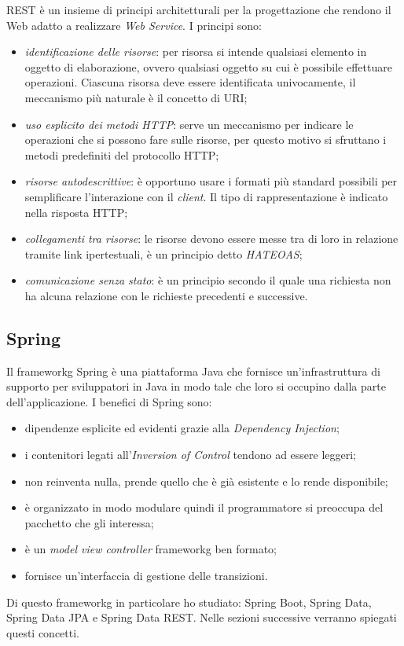 REST è un insieme di principi architetturali per la progettazione che rendono il Web adatto a realizzare \textit{Web Service}. I principi sono:
\begin{itemize}
	\item \textit{identificazione delle risorse}: per risorsa si intende qualsiasi elemento in oggetto di elaborazione, ovvero qualsiasi oggetto su cui è possibile effettuare operazioni. Ciascuna risorsa deve essere identificata univocamente, il meccanismo più naturale è il concetto di URI;
	\item \textit{uso esplicito dei metodi HTTP}: serve un meccanismo per indicare le operazioni che si possono fare sulle risorse, per questo motivo si sfruttano i metodi predefiniti del protocollo HTTP;
	\item \textit{risorse autodescrittive}: è opportuno usare i formati più standard possibili per semplificare l'interazione con il \textit{client}. Il tipo di rappresentazione è indicato nella risposta HTTP;
	\item \textit{collegamenti tra risorse}: le risorse devono essere messe tra di loro in relazione tramite link ipertestuali, è un principio detto \textit{HATEOAS};
	\item \textit{comunicazione senza stato}: è un principio secondo il quale una richiesta non ha alcuna relazione con le richieste precedenti e successive.
\end{itemize}

\subsection{Spring}
\label{subsec:spring}

Il \gls{frameworkg} Spring è una piattaforma Java che fornisce un'infrastruttura di supporto per sviluppatori in Java in modo tale che loro si occupino dalla parte dell'applicazione. I benefici di Spring sono:
\begin{itemize}
	\item dipendenze esplicite ed evidenti grazie alla \textit{Dependency Injection};
	\item i contenitori legati all'\textit{Inversion of Control} tendono ad essere leggeri;
	\item non reinventa nulla, prende quello che è già esistente e lo rende disponibile;
	\item è organizzato in modo modulare quindi il programmatore si preoccupa del pacchetto che gli interessa;
	\item è un \textit{model view controller} \gls{frameworkg} ben formato;
	\item fornisce un'interfaccia di gestione delle transizioni.
\end{itemize}
Di questo \gls{frameworkg} in particolare ho studiato: Spring Boot, Spring Data, Spring Data JPA e Spring Data REST. Nelle sezioni successive verranno spiegati questi concetti.


